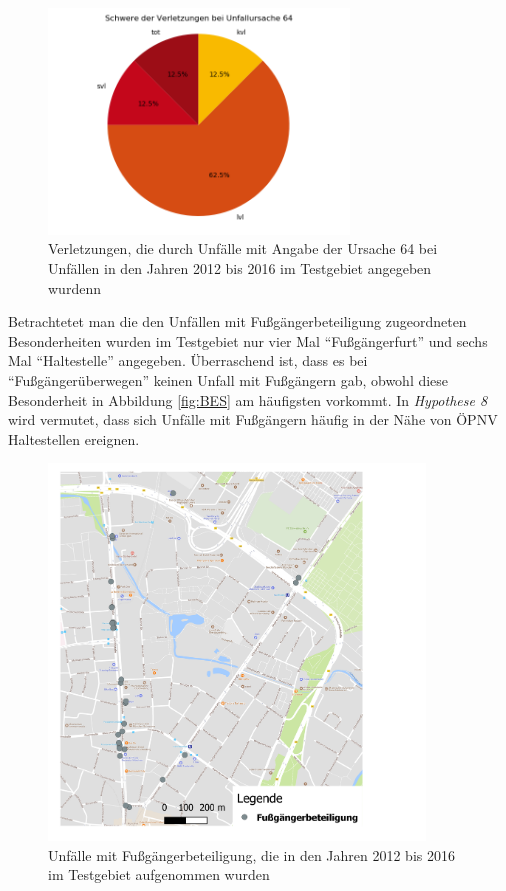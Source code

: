 \begin{savenotes}
	\begin{figure}[H]
		\centering
		\includegraphics[width=8cm,height=6cm]{figures/Urs64}
		\caption[Verletzungen, die durch Unfälle mit Angabe der Ursache 64 bei Unfällen in den Jahren 2012 bis 2016 im Testgebiet angegeben wurden]{Verletzungen, die durch Unfälle mit Angabe der Ursache 64 bei Unfällen in den Jahren 2012 bis 2016 im Testgebiet angegeben wurdenn}\label{fig:Verletzungen_Urs64}
	\end{figure}
\end{savenotes}


Betrachtetet man die den Unfällen mit Fußgängerbeteiligung zugeordneten Besonderheiten wurden im Testgebiet nur vier Mal \enquote{Fußgängerfurt} und sechs Mal \enquote{Haltestelle} angegeben. Überraschend ist, dass es bei \enquote{Fußgängerüberwegen} keinen Unfall mit Fußgängern gab, obwohl diese Besonderheit in Abbildung \ref{fig:BES} am häufigsten vorkommt. In \textit{Hypothese 8} wird vermutet, dass sich Unfälle mit Fußgängern häufig in der Nähe von ÖPNV Haltestellen ereignen.

\begin{savenotes}
	\begin{figure}[H]
		\centering
		\includegraphics[width=10cm,height=10cm]{figures/map_fussgaenger}
		\caption[Unfälle mit Fußgängerbeteiligung, die in den Jahren 2012 bis 2016 im Testgebiet aufgenommen wurden]{Unfälle mit Fußgängerbeteiligung, die in den Jahren 2012 bis 2016 im Testgebiet aufgenommen wurden}\label{fig:map_fussganeger}
	\end{figure}
\end{savenotes}

